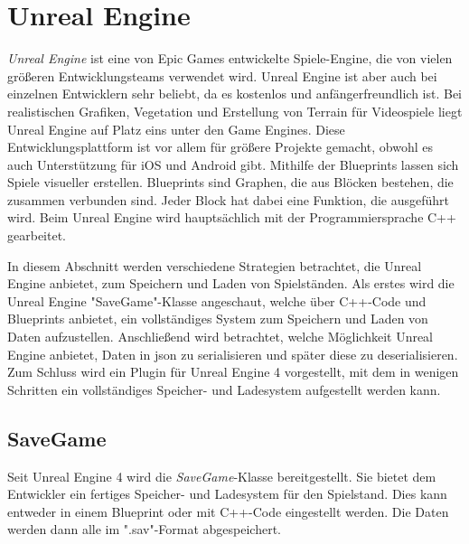 \section{Unreal Engine}
\textit{Unreal Engine} ist eine von Epic Games entwickelte Spiele-Engine, die von vielen größeren Entwicklungsteams verwendet wird. Unreal Engine ist aber auch bei einzelnen Entwicklern sehr beliebt, da es kostenlos und anfängerfreundlich ist. Bei realistischen Grafiken, Vegetation und Erstellung von Terrain für Videospiele liegt Unreal Engine auf Platz eins unter den Game Engines. Diese Entwicklungsplattform ist vor allem für größere Projekte gemacht, obwohl es auch Unterstützung für iOS und Android gibt. Mithilfe der Blueprints lassen sich Spiele visueller erstellen. Blueprints sind Graphen, die aus Blöcken bestehen, die zusammen verbunden sind. Jeder Block hat dabei eine Funktion, die ausgeführt wird. Beim Unreal Engine wird hauptsächlich mit der Programmiersprache C++ gearbeitet.\cite{vsmid2017comparison}

In diesem Abschnitt werden verschiedene Strategien betrachtet, die Unreal Engine anbietet, zum Speichern und Laden von Spielständen. Als erstes wird die Unreal Engine "SaveGame"-Klasse angeschaut, welche über C++-Code und Blueprints anbietet, ein vollständiges System zum Speichern und Laden von Daten aufzustellen. Anschließend wird betrachtet, welche Möglichkeit Unreal Engine anbietet, Daten in \ac{json} zu serialisieren und später diese zu deserialisieren. Zum Schluss wird ein Plugin für Unreal Engine 4 vorgestellt, mit dem in wenigen Schritten ein vollständiges Speicher- und Ladesystem aufgestellt werden kann. 



\subsection{SaveGame}
Seit Unreal Engine 4 wird die \textit{SaveGame}-Klasse bereitgestellt. Sie bietet dem Entwickler ein fertiges Speicher- und Ladesystem für den Spielstand. Dies kann entweder in einem Blueprint oder mit C++-Code eingestellt werden. Die Daten werden dann alle im ".sav"-Format abgespeichert.\cite{unrealengineSavingLoading}

